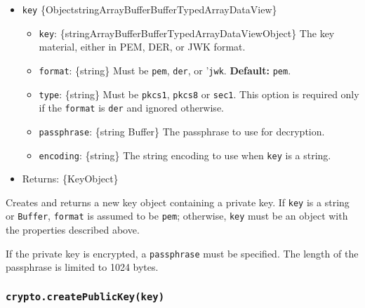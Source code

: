 \begin{itemize}
\tightlist
\item
  \texttt{key}
  \{Object\textbar string\textbar ArrayBuffer\textbar Buffer\textbar TypedArray\textbar DataView\}

  \begin{itemize}
  \tightlist
  \item
    \texttt{key}:
    \{string\textbar ArrayBuffer\textbar Buffer\textbar TypedArray\textbar DataView\textbar Object\}
    The key material, either in PEM, DER, or JWK format.
  \item
    \texttt{format}: \{string\} Must be
    \texttt{\textquotesingle{}pem\textquotesingle{}},
    \texttt{\textquotesingle{}der\textquotesingle{}}, or
    '\texttt{\textquotesingle{}jwk\textquotesingle{}}. \textbf{Default:}
    \texttt{\textquotesingle{}pem\textquotesingle{}}.
  \item
    \texttt{type}: \{string\} Must be
    \texttt{\textquotesingle{}pkcs1\textquotesingle{}},
    \texttt{\textquotesingle{}pkcs8\textquotesingle{}} or
    \texttt{\textquotesingle{}sec1\textquotesingle{}}. This option is
    required only if the \texttt{format} is
    \texttt{\textquotesingle{}der\textquotesingle{}} and ignored
    otherwise.
  \item
    \texttt{passphrase}: \{string \textbar{} Buffer\} The passphrase to
    use for decryption.
  \item
    \texttt{encoding}: \{string\} The string encoding to use when
    \texttt{key} is a string.
  \end{itemize}
\item
  Returns: \{KeyObject\}
\end{itemize}

Creates and returns a new key object containing a private key. If
\texttt{key} is a string or \texttt{Buffer}, \texttt{format} is assumed
to be \texttt{\textquotesingle{}pem\textquotesingle{}}; otherwise,
\texttt{key} must be an object with the properties described above.

If the private key is encrypted, a \texttt{passphrase} must be
specified. The length of the passphrase is limited to 1024 bytes.

\subsubsection{\texorpdfstring{\texttt{crypto.createPublicKey(key)}}{crypto.createPublicKey(key)}}\label{crypto.createpublickeykey}

